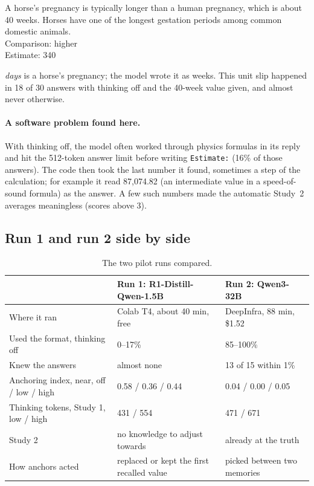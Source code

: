 \documentclass[11pt,a4paper]{article}
\begin{document}
\begin{transcript}
A horse's pregnancy is typically longer than a human pregnancy, which is about 40 weeks. Horses have one of the longest gestation periods among common domestic animals.\\ Comparison: higher\\ Estimate: 340
\end{transcript}
 \emph{days} is a horse's pregnancy; the model wrote it as weeks. This unit slip happened in 18 of 30 answers with thinking off and the 40-week value given, and almost never otherwise.

\paragraph{A software problem found here.} With thinking off, the model often worked through physics formulas in its reply and hit the 512-token answer limit before writing \texttt{Estimate:} (16\% of those answers). The code then took the last number it found, sometimes a step of the calculation; for example it read 87,074.82 (an intermediate value in a speed-of-sound formula) as the answer. A few such numbers made the automatic Study~2 averages meaningless (scores above 3).

\subsection{Run 1 and run 2 side by side}

\begin{table}[ht]
\centering\small
\begin{tabularx}{\textwidth}{@{}P{4.6cm}LL@{}}
\toprule
 & \textbf{Run 1: R1-Distill-Qwen-1.5B} & \textbf{Run 2: Qwen3-32B} \\
\midrule
Where it ran & Colab T4, about 40 min, free & DeepInfra, 88 min, \$1.52 \\
Used the format, thinking off & 0--17\% & 85--100\% \\
Knew the answers & almost none & 13 of 15 within 1\% \\
Anchoring index, near, off / low / high & 0.58 / 0.36 / 0.44 & 0.04 / 0.00 / 0.05 \\
Thinking tokens, Study 1, low / high & 431 / 554 & 471 / 671 \\
Study 2 & no knowledge to adjust towards & already at the truth \\
How anchors acted & replaced or kept the first recalled value & picked between two memories \\
\bottomrule
\end{tabularx}
\caption{The two pilot runs compared.}
\end{table}
\end{document}
